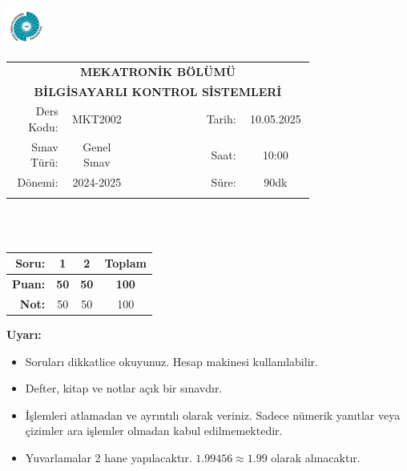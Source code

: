 \newcommand\UniversiteAdi{Niğde Ömer Halisdemir Üniversitesi}
\newcommand\BolumAdi{MEKATRONİK BÖLÜMÜ}
\newcommand\DersKodu{MKT2002}
\newcommand\DersAdi{BİLGİSAYARLI KONTROL SİSTEMLERİ}
\newcommand\SinavAdi{Genel Sınav}
\newcommand\SinavTarihi{10.05.2025}
\newcommand\SinavSaati{10:00}
\newcommand\SinavSuresi{90dk}

\pagestyle{fancy}
\fancyhf{} %
\noindent \includegraphics[width=0.1\textwidth]{logo}
\begin{tabular}{
    p{0.15\linewidth}
    p{0.15\linewidth}
    p{0.2\linewidth}
    p{0.1\linewidth}
    p{0.15\linewidth}}
    \multicolumn{5}{c}{\textbf{\BolumAdi}}\\
    \multicolumn{5}{c}{\textbf{\DersAdi}}\\\hline
    \multicolumn{1}{|r|}{Ders Kodu:}&
    \multicolumn{1}{|c|}{\DersKodu}&
    \multicolumn{1}{|c|}{}& 
    \multicolumn{1}{|r|}{Tarih:}&
    \multicolumn{1}{|c|}{\SinavTarihi} \\\hline
    \multicolumn{1}{|r|}{Sınav Türü:}&
    \multicolumn{1}{|c|}{\SinavAdi}&  
    \multicolumn{1}{|c|}{}&
    \multicolumn{1}{|r|}{Saat:}&
    \multicolumn{1}{|c|}{\SinavSaati}\\\hline
    \multicolumn{1}{|r|}{Dönemi:}&
    \multicolumn{1}{|c|}{2024-2025}&
    \multicolumn{1}{|c|}{}&
    \multicolumn{1}{|r|}{Süre:}&
    \multicolumn{1}{|c|}{\SinavSuresi} \\\hline
    &&&&\\
\end{tabular}\\\\
\noindent\begin{center}
\begin{tabular}{|r|c|c|c|}\hline
    \textbf{Soru:}&
    \textbf{1}&
    \textbf{2}&
    \textbf{Toplam}\\\hline
    \textbf{Puan:}&
    \textbf{50}&
    \textbf{50}&
    \textbf{100}\\\hline
    \textbf{Not:}&50&50&100\\\hline
\end{tabular}\end{center}
\noindent\textbf{Uyarı:}
\begin{itemize}\bfseries
    \item Soruları dikkatlice okuyunuz. Hesap makinesi kullanılabilir.
    \item Defter, kitap ve notlar açık bir sınavdır.
    \item İşlemleri atlamadan ve ayrıntılı olarak veriniz. Sadece nümerik yanıtlar veya çizimler ara işlemler olmadan kabul edilmemektedir.
    \item Yuvarlamalar 2 hane yapılacaktır. $\mathbf{1.99456\approx1.99}$ olarak alınacaktır.
\end{itemize}
    
